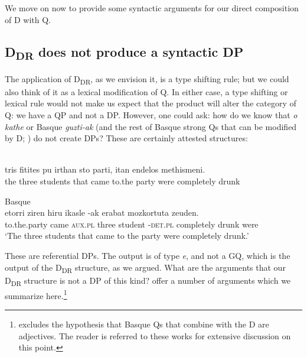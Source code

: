 \documentclass[output=paper,
modfonts
]{langscibook}
\begin{document}
We move on now to provide some syntactic arguments for our direct composition of D with Q.

\subsection{D\textsubscript{DR} does not produce a syntactic DP}

The application of D\textsubscript{DR}, as we envision it, is a type shifting rule; but we could also think of it as a lexical modification of Q. In either case, a type shifting or lexical rule would not make us expect that the product will alter the category of Q: we have a QP and not a DP. However, one could ask: how do we know that  \textit{o kathe} or Basque \textit{guzti-ak} (and the rest of Basque strong Qs that can be modified by D; \citealt{etxeberria2005, etxeberria2009}) do not create DPs? These are certainly attested structures:

\ea\label{ex:etxeberria:24}
	\ea
		\\
		 {\ob}{tris} {fitites} {pu} {irthan} {sto} {parti}{\cb}{\cb}, {itan} {endelos} {methismeni}.\\
		{\ob}the {\ob}three students that came to.the party{\cb}{\cb} were completely drunk\\
	
	\ex
		Basque\\
		 {etorri} {ziren} {hiru} {ikasle}{\cb} {-ak}{\cb} {erabat} {mozkortuta} {zeuden}.\\
		{\ob}to.the.party  came \textsc{aux.pl} three student{\cb} -\textsc{det.pl}{\cb} completely drunk were\\
		\glt `The three students that came to the party were completely drunk.'
	\z
\z

These are referential DPs. The output is of type \textit{e}, and not a GQ, which is the output of the D\textsubscript{DR} structure, as we argued. What are the arguments that our D\textsubscript{DR} structure is not a DP of this kind? \citet{etxeberria-giannakidou2014} offer a number of arguments which we summarize here.\footnote{\citet{etxeberria2005, etxeberria2009} excludes the hypothesis that Basque Qs that combine with the D are adjectives. The reader is referred to these works for extensive discussion on this point.}
\end{document}
